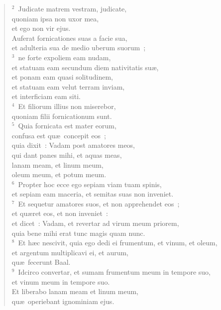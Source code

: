 \begin{verse}\vspace{6pt}${}^{2}$~Judicate matrem vestram, judicate,\\ quoniam ipsa non uxor mea,\\ et ego non vir ejus.\\ Auferat fornicationes suas a facie sua,\\ et adulteria sua de medio uberum suorum~;\\
${}^{3}$~ne forte expoliem eam nudam,\\ et statuam eam secundum diem nativitatis su\ae ,\\ et ponam eam quasi solitudinem,\\ et statuam eam velut terram inviam,\\ et interficiam eam siti.\\
${}^{4}$~Et filiorum illius non miserebor,\\ quoniam filii fornicationum sunt.\\
${}^{5}$~Quia fornicata est mater eorum,\\ confusa est qu\ae\ concepit eos~;\\ quia dixit~: Vadam post amatores meos,\\ qui dant panes mihi, et aquas meas,\\ lanam meam, et linum meum,\\ oleum meum, et potum meum.\\
${}^{6}$~Propter hoc ecce ego sepiam viam tuam spinis,\\ et sepiam eam maceria, et semitas suas non inveniet.\\
${}^{7}$~Et sequetur amatores suos, et non apprehendet eos~;\\ et qu\ae ret eos, et non inveniet~:\\ et dicet~: Vadam, et revertar ad virum meum priorem,\\ quia bene mihi erat tunc magis quam nunc.\\
${}^{8}$~Et h\ae c nescivit, quia ego dedi ei frumentum, et vinum, et oleum,\\ et argentum multiplicavi ei, et aurum,\\ qu\ae\ fecerunt Baal.\\
${}^{9}$~Idcirco convertar, et sumam frumentum meum in tempore suo,\\ et vinum meum in tempore suo.\\ Et liberabo lanam meam et linum meum,\\ qu\ae\ operiebant ignominiam ejus.\\

\end{verse}
